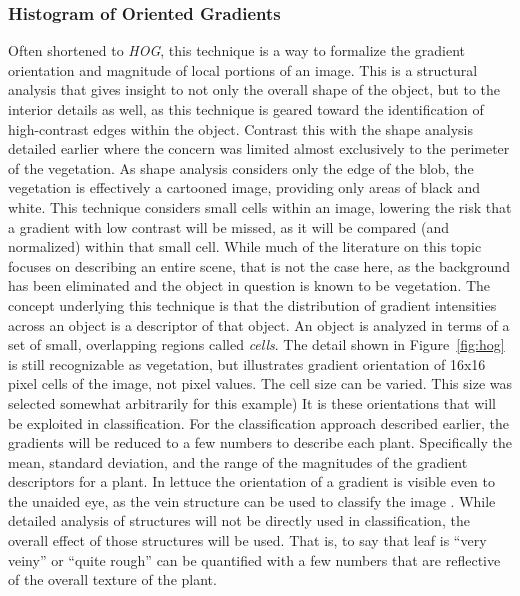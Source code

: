 \documentclass[letterpaper, notitlepage]{report}
\begin{document}
\subsubsection{Histogram of Oriented Gradients}
Often shortened to \textit{HOG}, this technique is a way to formalize the gradient orientation and magnitude of local portions of an image\parencite[p.~155]{Forsyth2012-hy}. This is a structural analysis that gives insight to not only the overall shape of the object, but to the interior details as well, as this technique is geared toward the identification of high-contrast edges within the object. Contrast this with the shape analysis detailed earlier where the concern was limited almost exclusively to the perimeter of the vegetation.  As shape analysis considers only the edge of the blob, the vegetation is effectively a cartooned image, providing only areas of black and white. This technique considers small cells within an image, lowering the risk that a gradient with low contrast will be missed, as it will be compared (and normalized) within that small cell. While much of the literature on this topic focuses on describing an entire scene, that is not the case here, as the background has been eliminated and the object in question is known to be vegetation. The concept underlying this technique is that the distribution of gradient intensities across an object is a descriptor of that object. An object is analyzed in terms of a set of small, overlapping regions called \textit{cells}.
The detail shown in Figure~\ref{fig:hog} is still recognizable as vegetation, but illustrates gradient orientation of 16x16 pixel cells of the image, not pixel values. The cell size can be varied. This size was selected somewhat arbitrarily for this example) It is these orientations that will be exploited in classification.  For the classification approach described earlier, the gradients will be reduced to a few numbers to describe each plant. Specifically the mean, standard deviation, and the range of the magnitudes of the gradient descriptors for a plant. In lettuce the orientation of a gradient is visible even to the unaided eye, as the vein structure can be used to classify the image \parencite{Elhariri2014-eo}. While detailed analysis of structures will not be directly used in classification, the overall effect of those structures will be used. That is, to say that leaf is ``very veiny'' or ``quite rough'' can be quantified with a few numbers that are reflective of the overall texture of the plant.
\end{document}
